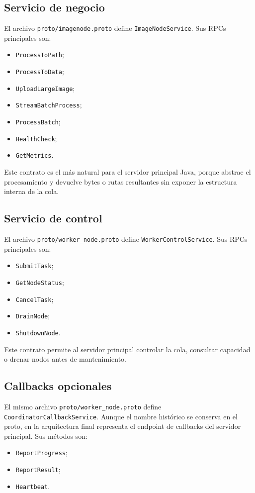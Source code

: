 \documentclass[conference]{IEEEtran}
\begin{document}
\subsection{Servicio de negocio}
El archivo \texttt{proto/imagenode.proto} define \texttt{ImageNodeService}. Sus RPCs principales son:
\begin{itemize}[leftmargin=*]
\item \texttt{ProcessToPath};
\item \texttt{ProcessToData};
\item \texttt{UploadLargeImage};
\item \texttt{StreamBatchProcess};
\item \texttt{ProcessBatch};
\item \texttt{HealthCheck};
\item \texttt{GetMetrics}.
\end{itemize}

Este contrato es el más natural para el servidor principal Java, porque abstrae el procesamiento y devuelve bytes o rutas resultantes sin exponer la estructura interna de la cola.

\subsection{Servicio de control}
El archivo \texttt{proto/worker\_node.proto} define \texttt{WorkerControlService}. Sus RPCs principales son:
\begin{itemize}[leftmargin=*]
\item \texttt{SubmitTask};
\item \texttt{GetNodeStatus};
\item \texttt{CancelTask};
\item \texttt{DrainNode};
\item \texttt{ShutdownNode}.
\end{itemize}

Este contrato permite al servidor principal controlar la cola, consultar capacidad o drenar nodos antes de mantenimiento.

\subsection{Callbacks opcionales}
El mismo archivo \texttt{proto/worker\_node.proto} define \texttt{CoordinatorCallbackService}. Aunque el nombre histórico se conserva en el proto, en la arquitectura final representa el endpoint de callbacks del servidor principal. Sus métodos son:
\begin{itemize}[leftmargin=*]
\item \texttt{ReportProgress};
\item \texttt{ReportResult};
\item \texttt{Heartbeat}.
\end{itemize}
\end{document}
